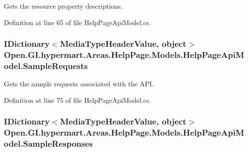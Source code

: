 Gets the resource property descriptions. 



Definition at line 65 of file Help\+Page\+Api\+Model.\+cs.

\hypertarget{class_open_1_1_g_i_1_1hypermart_1_1_areas_1_1_help_page_1_1_models_1_1_help_page_api_model_a5ba6db9c9586dc77949e8d824cca46b3}{}
\subsubsection[{Sample\+Requests}]{\setlength{\rightskip}{0pt plus 5cm}I\+Dictionary$<$Media\+Type\+Header\+Value, object$>$ Open.\+G\+I.\+hypermart.\+Areas.\+Help\+Page.\+Models.\+Help\+Page\+Api\+Model.\+Sample\+Requests\hspace{0.3cm}{\ttfamily [get]}}\label{class_open_1_1_g_i_1_1hypermart_1_1_areas_1_1_help_page_1_1_models_1_1_help_page_api_model_a5ba6db9c9586dc77949e8d824cca46b3}


Gets the sample requests associated with the A\+P\+I. 



Definition at line 75 of file Help\+Page\+Api\+Model.\+cs.

\hypertarget{class_open_1_1_g_i_1_1hypermart_1_1_areas_1_1_help_page_1_1_models_1_1_help_page_api_model_a08ca3610bd41722c64d0a58231e358a3}{}
\subsubsection[{Sample\+Responses}]{\setlength{\rightskip}{0pt plus 5cm}I\+Dictionary$<$Media\+Type\+Header\+Value, object$>$ Open.\+G\+I.\+hypermart.\+Areas.\+Help\+Page.\+Models.\+Help\+Page\+Api\+Model.\+Sample\+Responses\hspace{0.3cm}{\ttfamily [get]}}\label{class_open_1_1_g_i_1_1hypermart_1_1_areas_1_1_help_page_1_1_models_1_1_help_page_api_model_a08ca3610bd41722c64d0a58231e358a3}


